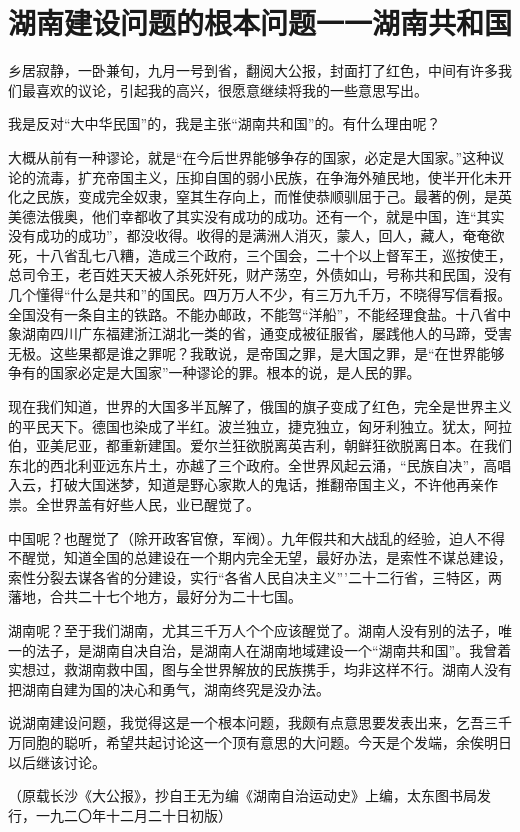 \section{湖南建设问题的根本问题一一湖南共和国}



乡居寂静，一卧兼旬，九月一号到省，翻阅大公报，封面打了红色，中间有许多我们最喜欢的议论，引起我的高兴，很愿意继续将我的一些意思写出。

我是反对“大中华民国”的，我是主张“湖南共和国”的。有什么理由呢？

大概从前有一种谬论，就是“在今后世界能够争存的国家，必定是大国家。”这种议论的流毒，扩充帝国主义，压抑自国的弱小民族，在争海外殖民地，使半开化未开化之民族，变成完全奴隶，窒其生存向上，而惟使恭顺驯屈于己。最著的例，是英美德法俄奥，他们幸都收了其实没有成功的成功。还有一个，就是中国，连“其实没有成功的成功”，都没收得。收得的是满洲人消灭，蒙人，回人，藏人，奄奄欲死，十八省乱七八糟，造成三个政府，三个国会，二十个以上督军王，巡按使王，总司令王，老百姓天天被人杀死奸死，财产荡空，外债如山，号称共和民国，没有几个懂得“什么是共和”的国民。四万万人不少，有三万九千万，不晓得写信看报。全国没有一条自主的铁路。不能办邮政，不能驾“洋船”，不能经理食盐。十八省中象湖南四川广东福建浙江湖北一类的省，通变成被征服省，屡践他人的马蹄，受害无极。这些果都是谁之罪呢？我敢说，是帝国之罪，是大国之罪，是“在世界能够争有的国家必定是大国家”一种谬论的罪。根本的说，是人民的罪。

现在我们知道，世界的大国多半瓦解了，俄国的旗子变成了红色，完全是世界主义的平民天下。德国也染成了半红。波兰独立，捷克独立，匈牙利独立。犹太，阿拉伯，亚美尼亚，都重新建国。爱尔兰狂欲脱离英吉利，朝鲜狂欲脱离日本。在我们东北的西北利亚远东片土，亦越了三个政府。全世界风起云涌，“民族自决”，高唱入云，打破大国迷梦，知道是野心家欺人的鬼话，推翻帝国主义，不许他再亲作祟。全世界盖有好些人民，业已醒觉了。

中国呢？也醒觉了（除开政客官僚，军阀）。九年假共和大战乱的经验，迫人不得不醒觉，知道全国的总建设在一个期内完全无望，最好办法，是索性不谋总建设，索性分裂去谋各省的分建设，实行“各省人民自决主义”’二十二行省，三特区，两藩地，合共二十七个地方，最好分为二十七国。

湖南呢？至于我们湖南，尤其三千万人个个应该醒觉了。湖南人没有别的法子，唯一的法子，是湖南自决自治，是湖南人在湖南地域建设一个“湖南共和国”。我曾着实想过，救湖南救中国，图与全世界解放的民族携手，均非这样不行。湖南人没有把湖南自建为国的决心和勇气，湖南终究是没办法。

说湖南建设问题，我觉得这是一个根本问题，我颇有点意思要发表出来，乞吾三千万同胞的聪听，希望共起讨论这一个顶有意思的大问题。今天是个发端，余俟明日以后继该讨论。

{\raggedleft（原载长沙《大公报》，抄自王无为编《湖南自治运动史》上编，太东图书局发行，一九二〇年十二月二十日初版）}

